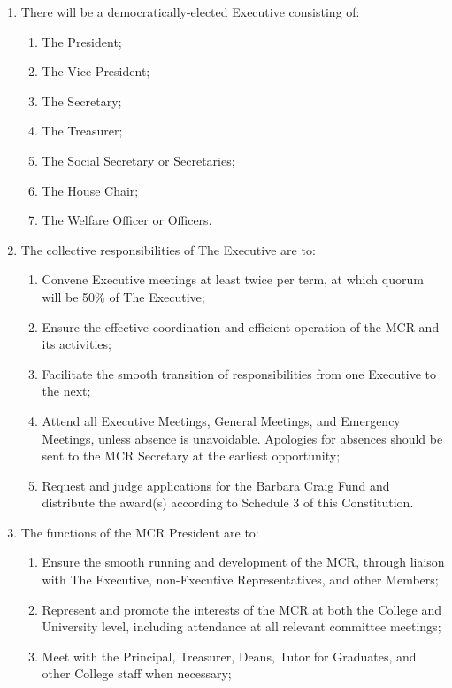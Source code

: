 \documentclass[11pt, a4paper]{article}
\begin{document}
\begin{enumerate}
	\item There will be a democratically-elected Executive consisting of:
    \begin{enumerate}
        \item The President;
        \item The Vice President;
        \item The Secretary;
        \item The Treasurer;
        \item The Social Secretary or Secretaries;
        \item The House Chair;
        \item The Welfare Officer or Officers.
    \end{enumerate}
    \item The collective responsibilities of The Executive are to:
    \begin{enumerate}
        \item Convene Executive meetings at least twice per term, at which quorum will be 50\% of The Executive;
        \item Ensure the effective coordination and efficient operation of the MCR and its activities;
        \item Facilitate the smooth transition of responsibilities from one Executive to the next;
        \item Attend all Executive Meetings, General Meetings, and Emergency Meetings, unless absence is unavoidable. Apologies for absences should be sent to the MCR Secretary at the earliest opportunity;
        \item Request and judge applications for the Barbara Craig Fund and distribute the award(s) according to Schedule 3 of this Constitution.
    \end{enumerate}
    \item The functions of the MCR President are to:
    \begin{enumerate}
        \item Ensure the smooth running and development of the MCR, through liaison with The Executive, non-Executive Representatives, and other Members;
        \item Represent and promote the interests of the MCR at both the College and University level, including attendance at all relevant committee meetings;
        \item Meet with the Principal, Treasurer, Deans, Tutor for Graduates, and other College staff when necessary;

\end{enumerate}
\end{enumerate}
\end{document}
